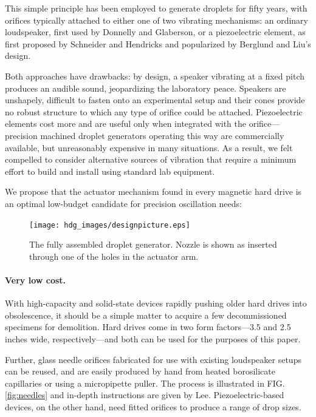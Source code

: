 \documentclass[aip,rsi,reprint,graphicx]{revtex4-1} %
\begin{document}
This simple principle has been employed to generate droplets for fifty years,
with orifices typically attached to either one of two vibrating mechanisms: an
ordinary loudspeaker, first used by Donnelly and Glaberson\cite{Donnelly66}, or
a piezoelectric element, as first proposed by Schneider and
Hendricks\cite{Schneider64} and popularized by Berglund and Liu's
design\cite{Berglund73}.

Both approaches have drawbacks: by design, a speaker vibrating at a fixed pitch
produces an audible sound, jeopardizing the laboratory peace. Speakers are unshapely,
difficult to fasten onto an experimental setup and their cones provide no robust
structure to which any type of orifice could be attached. Piezoelectric elements
cost more and are useful only when integrated with the orifice---precision
machined droplet generators operating this way are commercially available, but
unreasonably expensive in many situations. As a result, we felt compelled to
consider alternative sources of vibration that require a minimum effort to build
and install using standard lab equipment.

We propose that the actuator mechanism
found in every magnetic hard drive is an optimal low-budget candidate for
precision oscillation needs:

\begin{figure}
\centering
\texttt{[image: hdg\_images/designpicture.eps]}
\caption{The fully assembled droplet generator. Nozzle is shown as inserted
through one of the holes in the actuator arm. \label{fig:photo}}
\end{figure}

\paragraph*{Very low cost.} With high-capacity and solid-state devices rapidly pushing older hard drives
into obsolescence, it should be a simple matter to acquire a few decommissioned specimens for
demolition. Hard drives come in two form factors---3.5 and 2.5 inches wide,
respectively---and both can be used for the purposes of this paper. 

Further, glass needle orifices fabricated for use with existing loudspeaker setups can be
reused, and are easily produced by hand from heated borosilicate capillaries or
using a micropipette puller. The process is illustrated in FIG.
\ref{fig:needles} and in-depth instructions are given by Lee\cite{Lee02}.
Piezoelectric-based devices, on the other hand, need fitted orifices to produce a range of
drop sizes.
\end{document}
